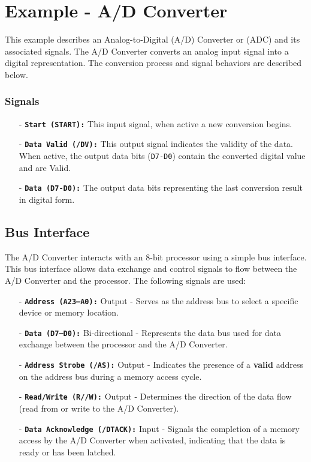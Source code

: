 \section{Example - A/D Converter}
This example describes an Analog-to-Digital (A/D) Converter or (ADC) and its associated signals. The A/D Converter converts an analog input signal into a digital representation. The conversion process and signal behaviors are described below.
\subsubsection*{Signals}
\begin{itemize}
    \item[-] \texttt{\textbf{Start (START):}} This input signal, when active a new conversion begins.
    \item[-] \texttt{\textbf{Data Valid (/DV):}} This output signal indicates the validity of the data. When active, the output data bits (\texttt{D7-D0}) contain the converted digital value and are Valid.
    \item[-] \texttt{\textbf{Data (D7-D0):}} The output data bits representing the last conversion result in digital form.
\end{itemize}

\subsection{Bus Interface}
The A/D Converter interacts with an 8-bit processor using a simple bus interface. This bus interface allows data exchange and control signals to flow between the A/D Converter and the processor. The following signals are used:

\begin{itemize}
    \item[-] \texttt{\textbf{Address (A23--A0):}} Output - Serves as the address bus to select a specific device or memory location.
    \item[-] \texttt{\textbf{Data (D7--D0):}} Bi-directional - Represents the data bus used for data exchange between the processor and the A/D Converter.
    \item[-] \texttt{\textbf{Address Strobe (/AS):}} Output - Indicates the presence of a \textbf{valid} address on the address bus during a memory access cycle.
    \item[-] \texttt{\textbf{Read/Write (R//W):}} Output - Determines the direction of the data flow (read from or write to the A/D Converter).
    \item[-] \texttt{\textbf{Data Acknowledge (/DTACK):}} Input - Signals the completion of a memory access by the A/D Converter when activated, indicating that the data is ready or has been latched.
\end{itemize}

